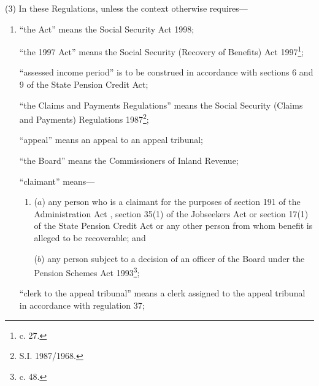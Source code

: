 \documentclass[12pt,a4paper]{article}
\begin{document}
(3) In these Regulations, unless the context otherwise requires—
\begin{enumerate}\item[]
“the Act” means the Social Security Act 1998;

“the 1997 Act” means the Social Security (Recovery of Benefits) Act 1997\footnote{ c. 27.};


“assessed income period” is to be construed in accordance with sections 6 and 9 of the State Pension Credit Act;

“the Claims and Payments Regulations” means the Social Security (Claims and Payments) Regulations 1987\footnote{\frenchspacing S.I. 1987/1968.};

“appeal” means an appeal to an appeal tribunal;

“the Board” means the Commissioners of Inland Revenue;

“claimant” means—
\begin{enumerate}\item[]
($a$) any person who is a claimant for the purposes of section 191 of the Administration Act%
, section 35(1) of the Jobseekers Act or section 17(1) of the State Pension Credit Act  %
or any other person from whom benefit is alleged to be recoverable; and

($b$) any person subject to a decision of 
an officer of the Board  %
under the Pension Schemes Act 1993\footnote{ c. 48.};
\end{enumerate}

“clerk to the appeal tribunal” means a clerk assigned to the appeal tribunal in accordance with regulation 37;


\end{enumerate}
\end{document}
